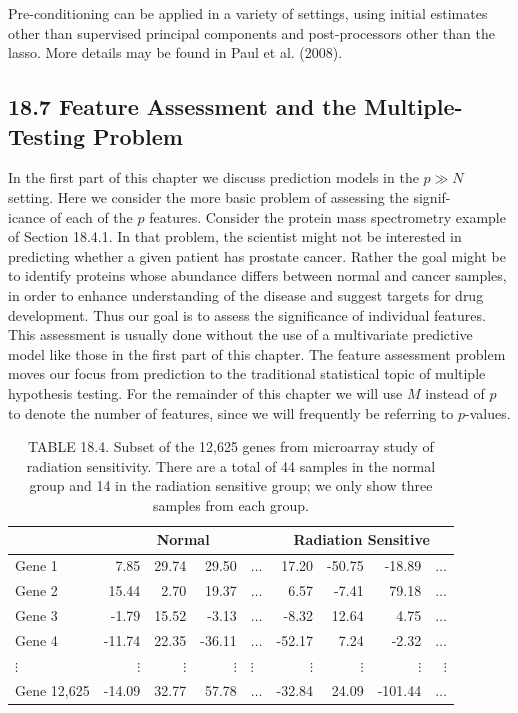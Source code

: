 \documentclass[10pt]{article}
\begin{document}
Pre-conditioning can be applied in a variety of settings, using initial estimates other than supervised principal components and post-processors other than the lasso. More details may be found in Paul et al. (2008).

\subsection*{18.7 Feature Assessment and the Multiple-Testing Problem}
In the first part of this chapter we discuss prediction models in the $p \gg N$ setting. Here we consider the more basic problem of assessing the signif-\\
icance of each of the $p$ features. Consider the protein mass spectrometry example of Section 18.4.1. In that problem, the scientist might not be interested in predicting whether a given patient has prostate cancer. Rather the goal might be to identify proteins whose abundance differs between normal and cancer samples, in order to enhance understanding of the disease and suggest targets for drug development. Thus our goal is to assess the significance of individual features. This assessment is usually done without the use of a multivariate predictive model like those in the first part of this chapter. The feature assessment problem moves our focus from prediction to the traditional statistical topic of multiple hypothesis testing. For the remainder of this chapter we will use $M$ instead of $p$ to denote the number of features, since we will frequently be referring to $p$-values.

\begin{table}[h]
\begin{center}
\captionsetup{labelformat=empty}
\caption{TABLE 18.4. Subset of the 12,625 genes from microarray study of radiation sensitivity. There are a total of 44 samples in the normal group and 14 in the radiation sensitive group; we only show three samples from each group.}
\begin{tabular}{l|rrrl|rrrr}
\hline
 & \multicolumn{4}{|c}{Normal} & \multicolumn{4}{c}{Radiation Sensitive} \\
\hline
Gene 1 & 7.85 & 29.74 & 29.50 & $\ldots$ & 17.20 & -50.75 & -18.89 & $\ldots$ \\
Gene 2 & 15.44 & 2.70 & 19.37 & $\ldots$ & 6.57 & -7.41 & 79.18 & $\ldots$ \\
Gene 3 & -1.79 & 15.52 & -3.13 & $\ldots$ & -8.32 & 12.64 & 4.75 & $\ldots$ \\
Gene 4 & -11.74 & 22.35 & -36.11 & $\ldots$ & -52.17 & 7.24 & -2.32 & $\ldots$ \\
$\vdots$ & $\vdots$ & $\vdots$ & $\vdots$ & $\vdots$ & $\vdots$ & $\vdots$ & $\vdots$ & $\vdots$ \\
Gene 12,625 & -14.09 & 32.77 & 57.78 & $\ldots$ & -32.84 & 24.09 & -101.44 & $\ldots$ \\
\hline
\end{tabular}
\end{center}
\end{table}
\end{document}
